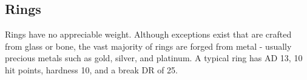         \subsection{Rings}

             Rings have no appreciable weight.
            Although exceptions exist that are crafted from glass or bone, the vast majority of rings are forged from metal - usually precious metals such as gold, silver, and platinum.
            A typical ring has AD 13, 10 hit points, hardness 10, and a break DR of 25.

\begin{comment}
                \begin{dtable}
                    \lcaption{Rings}
                    \begin{dtabularx}{\columnwidth}{>{\lcol}X l}
                        Ring & Market Price \\
                        \hline
                        Protection \plus1 & 2,000 gp \\
                        Feather falling & 2,200 gp \\
                        Climbing & 2,500 gp \\
                        Jumping & 2,500 gp \\
                        Sustenance & 2,500 gp \\
                        Swimming & 2,500 gp \\
                        Mind shielding & 8,000 gp \\
                        Protection \plus2 & 8,000 gp \\
                        Climbing, improved & 10,000 gp \\
                        Jumping, improved & 10,000 gp \\
                        Swimming, improved & 10,000 gp \\
                        Energy resistance, minor & 12,000 gp \\
                        Protection \plus3 & 18,000 gp \\
                        Energy resistance, major & 28,000 gp \\
                        Protection \plus4 & 32,000 gp \\
                        Energy resistance, greater & 44,000 gp \\
                        Protection \plus5 & 50,000 gp \\
                    \end{dtabularx}
                \end{dtable}
\end{comment}

